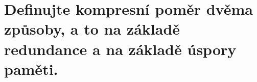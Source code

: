 \section{Definujte kompresní poměr dvěma způsoby, a to na základě redundance a na základě úspory paměti.}